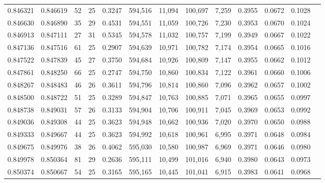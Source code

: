 \begin{tabular}{rrrrrrrrrrrrr}
0.846321 & 0.846619 &    52 &  25 &                                     0.3247 & 594,516 &  11,094 & 100,697 &   7,259 & 0.3955 & 0.0672 & 0.1028 \\
0.846630 & 0.846890 &    35 &  29 &                                     0.4531 & 594,551 &  11,059 & 100,726 &   7,230 & 0.3953 & 0.0670 & 0.1024 \\
0.846913 & 0.847111 &    27 &  31 &                                     0.5345 & 594,578 &  11,032 & 100,757 &   7,199 & 0.3949 & 0.0667 & 0.1022 \\
0.847136 & 0.847516 &    61 &  25 &                                     0.2907 & 594,639 &  10,971 & 100,782 &   7,174 & 0.3954 & 0.0665 & 0.1016 \\
0.847522 & 0.847839 &    45 &  27 &                                     0.3750 & 594,684 &  10,926 & 100,809 &   7,147 & 0.3955 & 0.0662 & 0.1012 \\
0.847861 & 0.848250 &    66 &  25 &                                     0.2747 & 594,750 &  10,860 & 100,834 &   7,122 & 0.3961 & 0.0660 & 0.1006 \\
0.848267 & 0.848483 &    46 &  26 &                                     0.3611 & 594,796 &  10,814 & 100,860 &   7,096 & 0.3962 & 0.0657 & 0.1002 \\
0.848500 & 0.848722 &    51 &  25 &                                     0.3289 & 594,847 &  10,763 & 100,885 &   7,071 & 0.3965 & 0.0655 & 0.0997 \\
0.848738 & 0.849031 &    57 &  26 &                                     0.3133 & 594,904 &  10,706 & 100,911 &   7,045 & 0.3969 & 0.0653 & 0.0992 \\
0.849036 & 0.849308 &    44 &  25 &                                     0.3623 & 594,948 &  10,662 & 100,936 &   7,020 & 0.3970 & 0.0650 & 0.0988 \\
0.849333 & 0.849667 &    44 &  25 &                                     0.3623 & 594,992 &  10,618 & 100,961 &   6,995 & 0.3971 & 0.0648 & 0.0984 \\
0.849675 & 0.849976 &    38 &  26 &                                     0.4062 & 595,030 &  10,580 & 100,987 &   6,969 & 0.3971 & 0.0646 & 0.0980 \\
0.849978 & 0.850364 &    81 &  29 &                                     0.2636 & 595,111 &  10,499 & 101,016 &   6,940 & 0.3980 & 0.0643 & 0.0973 \\
0.850374 & 0.850667 &    54 &  25 &                                     0.3165 & 595,165 &  10,445 & 101,041 &   6,915 & 0.3983 & 0.0641 & 0.0968 \\

\end{tabular}
